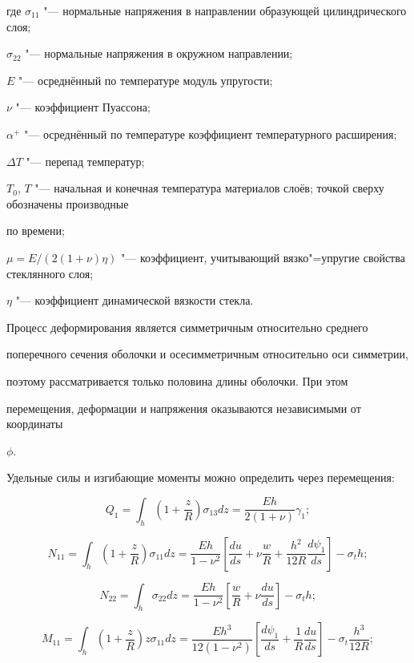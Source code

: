 где $\sigma _{11}$ "--- нормальные напряжения в направлении образующей цилиндрического слоя;

$\sigma _{22}$ "--- нормальные напряжения в окружном направлении;

$E$ "--- осреднённый по температуре модуль упругости;

$\nu $ "---  коэффициент Пуассона;

$\alpha ^{+}$ "--- осреднённый по температуре коэффициент температурного расширения;

$\Delta T$  "--- перепад температур; 

$T_{0}$, $T$ "--- начальная и конечная температура материалов слоёв; точкой сверху обозначены производные 

по времени; 

$\mu = E/ (2(1+\nu)\eta)$ "--- коэффициент, учитывающий вязко"=упругие свойства стеклянного слоя;

$\eta $ "--- коэффициент динамической вязкости стекла.



Процесс деформирования является симметричным относительно среднего 

поперечного сечения оболочки и осесимметричным относительно оси симметрии, 

поэтому рассматривается только половина длины оболочки. При этом 

перемещения, деформации и напряжения оказываются независимыми от координаты 

$\phi $.



Удельные силы и изгибающие моменты можно определить через перемещения:

\[

Q_1 =\int_h \left( 1+\frac{z}{R} \right)\sigma _{13} dz =\frac{Eh}{2(1+\nu)}\gamma _1 ;

\]

\[

N_{11} =\int_h \left( 1+\frac{z}{R}  \right)\sigma _{11} dz= \frac{Eh}{1-\nu ^2}\left[ \frac{du}{ds}+\nu 

\frac{w}{R}+\frac{h^2}{12R}\frac{d\psi _1 }{ds} \right]-\sigma _t h;

\]

\[

N_{22} =\int_h {\sigma _{22} dz} =\frac{Eh}{1-\nu ^2}\left[  \frac{w}{R}+\nu \frac{du}{ds} \right]-\sigma _t h;

\]

\[

M_{11} =\int_h \left( {1+\frac{z}{R}} \right)z\sigma _{11} dz =\frac{Eh^3}{12( 1-\nu ^2)}\left[ \frac{d\psi _1 

}{ds}+\frac{1}{R}\frac{du}{ds} \right]-\sigma _t \frac{h^3}{12R};

\]

